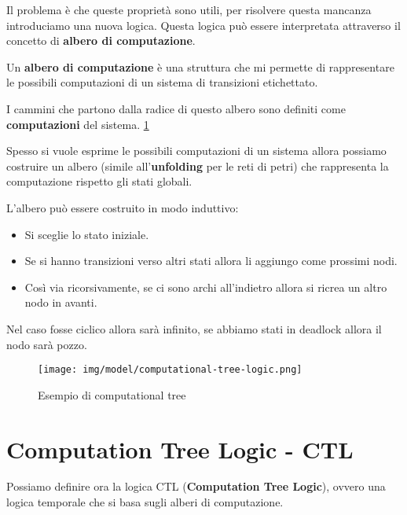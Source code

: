 Il problema è che queste proprietà sono utili, per risolvere questa mancanza
introduciamo una nuova logica. Questa logica può essere interpretata attraverso
il concetto di \textbf{albero di computazione}.
\begin{definizione}
    Un \textbf{albero di computazione} è una struttura che mi permette di
    rappresentare le possibili computazioni di un sistema di transizioni
    etichettato.

    I cammini che partono dalla radice di questo albero sono definiti come
    \textbf{computazioni} del sistema. \ref{fig:computational-tree-logic}
\end{definizione}
\begin{nota}
    Spesso si vuole esprime le possibili computazioni di un sistema allora
    possiamo costruire un albero (simile all'\textbf{unfolding} per le reti di
    petri) che rappresenta la computazione rispetto gli stati globali.

    L'albero può essere costruito in modo induttivo:
    \begin{itemize}
        \item Si sceglie lo stato iniziale.
        \item Se si hanno transizioni verso altri stati allora li aggiungo come
              prossimi nodi.
        \item Così via ricorsivamente, se ci sono archi all'indietro allora
              si ricrea un altro nodo in avanti.
    \end{itemize}
    Nel caso fosse ciclico allora sarà infinito, se abbiamo stati in deadlock
    allora il nodo sarà pozzo.
\end{nota}
\begin{figure}
    \centering
    \texttt{[image: img/model/computational-tree-logic.png]}
    \caption{Esempio di computational tree}
    \label{fig:computational-tree-logic}
\end{figure}
\section{Computation Tree Logic - CTL}
Possiamo definire ora la logica CTL (\textbf{Computation Tree Logic}), ovvero
una logica temporale che si basa sugli alberi di computazione.


